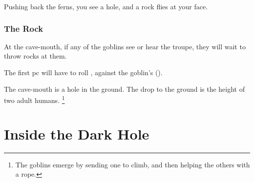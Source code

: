 \begin{multicols}{2}
\begin{boxtext}
  Pushing back the ferns, you see a hole, and a rock flies at your face.
\end{boxtext}

\subsubsection{The Rock}
At the cave-mouth, if any of the goblins see or hear the troupe, they will wait to throw rocks at them.


The first \gls{pc} will have to roll , against the goblin's  (\tn).

The cave-mouth is a hole in the ground.
The drop to the ground is the height of two adult humans.%
\footnote{The goblins emerge by sending one to climb, and then helping the others with a rope.}

\end{multicols}

\needspace{15em}
\section{Inside the Dark Hole}

